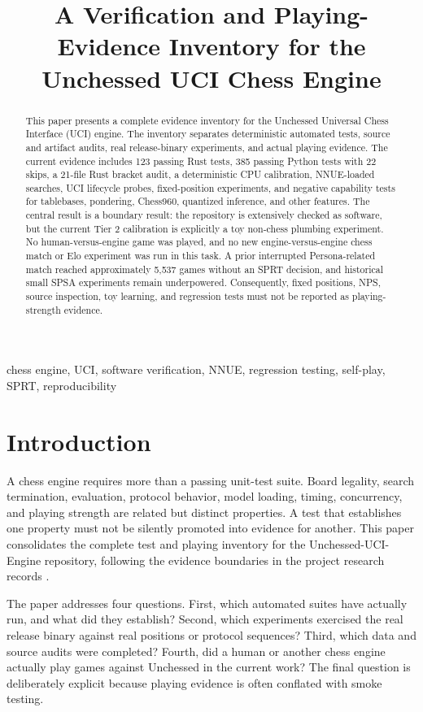 \documentclass[conference]{IEEEtran}
\title{A Verification and Playing-Evidence Inventory for the Unchessed UCI Chess Engine}
\author{\IEEEauthorblockN{Manus AI}
\IEEEauthorblockA{Verification and Research Facilities\
Unchessed-UCI-Engine\
Branch: \code{manus/research-facilities}}}
\begin{document}
\maketitle

\begin{abstract}
This paper presents a complete evidence inventory for the Unchessed Universal Chess Interface (UCI) engine. The inventory separates deterministic automated tests, source and artifact audits, real release-binary experiments, and actual playing evidence. The current evidence includes 123 passing Rust tests, 385 passing Python tests with 22 skips, a 21-file Rust bracket audit, a deterministic CPU calibration, NNUE-loaded searches, UCI lifecycle probes, fixed-position experiments, and negative capability tests for tablebases, pondering, Chess960, quantized inference, and other features. The central result is a boundary result: the repository is extensively checked as software, but the current Tier 2 calibration is explicitly a toy non-chess plumbing experiment. No human-versus-engine game was played, and no new engine-versus-engine chess match or Elo experiment was run in this task. A prior interrupted Persona-related match reached approximately 5,537 games without an SPRT decision, and historical small SPSA experiments remain underpowered. Consequently, fixed positions, NPS, source inspection, toy learning, and regression tests must not be reported as playing-strength evidence.
\end{abstract}

\begin{IEEEkeywords}
chess engine, UCI, software verification, NNUE, regression testing, self-play, SPRT, reproducibility
\end{IEEEkeywords}

\section{Introduction}
A chess engine requires more than a passing unit-test suite. Board legality, search termination, evaluation, protocol behavior, model loading, timing, concurrency, and playing strength are related but distinct properties. A test that establishes one property must not be silently promoted into evidence for another. This paper consolidates the complete test and playing inventory for the Unchessed-UCI-Engine repository, following the evidence boundaries in the project research records \cite{tier1master,update3,tier2}.

The paper addresses four questions. First, which automated suites have actually run, and what did they establish? Second, which experiments exercised the real release binary against real positions or protocol sequences? Third, which data and source audits were completed? Fourth, did a human or another chess engine actually play games against Unchessed in the current work? The final question is deliberately explicit because playing evidence is often conflated with smoke testing.
\end{document}
